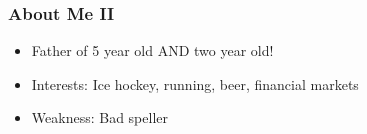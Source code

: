 \documentclass[9pt]{beamer}
\begin{document}


\begin{frame}[t]
\frametitle{About Me II}
\begin{itemize}
\item Father of 5 year old AND two year old!%
\medskip
\item Interests: Ice hockey, running, beer, financial markets
\medskip
\item Weakness: Bad speller
\end{itemize}
\bigskip
\end{frame}
\end{document}
